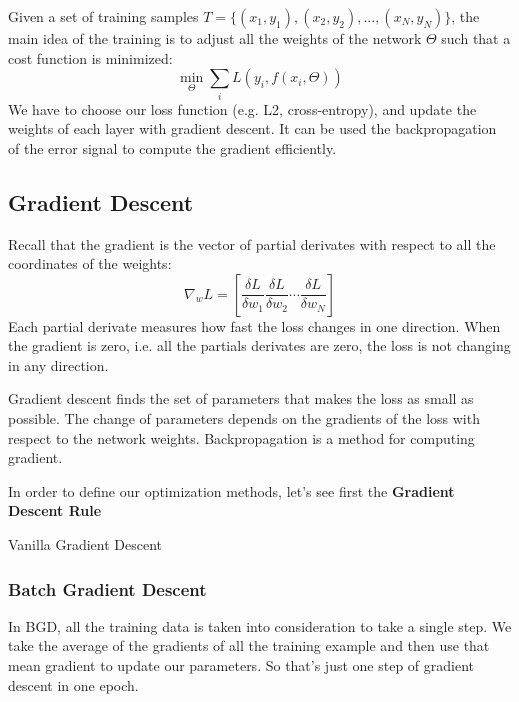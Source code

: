 Given a set of training samples \(T = \{(x_1, y_1), (x_2, y_2), ..., (x_N, y_N)\}\), the main idea of the training is to adjust all the weights of the network \(\Theta\) such that a cost function is minimized:
\begin{equation}
    \min_\Theta \sum_i L\left(y_i, f(x_i, \Theta)\right)
\end{equation}
We have to choose our loss function (e.g. L2, cross-entropy), and update the weights of each layer with gradient descent. It can be used the backpropagation of the error signal to compute the gradient efficiently.

\subsection{Gradient Descent}
Recall that the gradient is the vector of partial derivates with respect to all the coordinates of the weights:
\begin{equation}
    \nabla_wL = \left[ \frac {\delta L} {\delta w_1} \frac {\delta L} {\delta w_2} \cdots \frac {\delta L} {\delta w_N} \right]
\end{equation}
Each partial derivate measures how fast the loss changes in one direction. When the gradient is zero, i.e. all the partials derivates are zero, the loss is not changing in any direction.

Gradient descent finds the set of parameters that makes the loss as small as possible. The change of parameters depends on the gradients of the loss with respect to the network weights. Backpropagation is a method for computing gradient.

In order to define our optimization methods, let's see first the \textbf{Gradient Descent Rule}
\begin{algorithm}
    \caption{Vanilla Gradient Descent}
    \label{alg:vanilla_grad_desc}
\end{algorithm}

\subsubsection{Batch Gradient Descent}
In BGD, all the training data is taken into consideration to take a single step. We take the average of the gradients of all the training example and then use that mean gradient to update our parameters. So that's just one step of gradient descent in one epoch.

